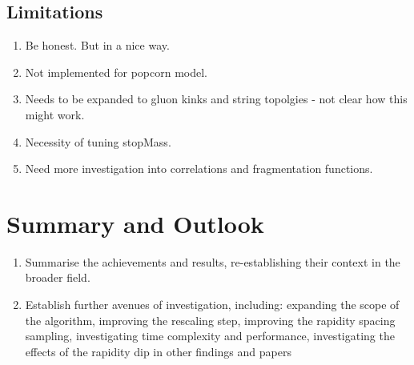 \documentclass[12pt,a4paper]{report}
\begin{document}
\section{Limitations}
\begin{enumerate}
\item Be honest. But in a nice way.
\item Not implemented for popcorn model.
\item Needs to be expanded to gluon kinks and string topolgies - not clear how this might work.
\item Necessity of tuning stopMass.
\item Need more investigation into correlations and fragmentation functions.
\end{enumerate}

\chapter{Summary and Outlook}
\begin{enumerate}
\item Summarise the achievements and results, re-establishing their context in the broader field.
\item Establish further avenues of investigation, including: expanding the scope of the algorithm, improving the rescaling step, improving the rapidity spacing sampling, investigating time complexity and performance, investigating the effects of the rapidity dip in other findings and papers
\end{enumerate}



\end{document}
